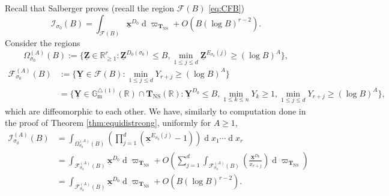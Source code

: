 \documentclass[11pt,letterpaper]{amsart}
\newcommand{\BG}{{\mathbb {G}}}
\newcommand{\BR}{{\mathbb {R}}}
\newcommand{\CF}{{\mathcal {F}}}
\newcommand{\CI}{{\mathcal {I}}}
\newcommand{\xx}{\underline{\mathbf{x}}}
\newcommand{\YY}{\underline{\mathbf{Y}}}
\newcommand{\ZZ}{\underline{\mathbf{Z}}}
\newcommand{\CTNS}{\mathbf{T}_{\operatorname{NS}}}
\theoremstyle{plain}
\numberwithin{equation}{section}
\theoremstyle{definition}
\theoremstyle{remark}
\begin{document}
 Recall that Salberger \cite[Lemma 11.38]{Salberger} proves (recall the region $\CF(B)$ \eqref{eq:CFB})	$$\CI_{\sigma_0}(B)=\int_{\CF(B)}\xx^{D_0}\operatorname{d}\varpi_{\CTNS}+O(B(\log B)^{r-2}).$$ Consider the regions
	$$\Omega_{\sigma_0}^{(A)}(B):=\{\ZZ\in\BR_{\geqslant 1}^r:\ZZ^{D_0(\sigma_0)}\leqslant B,\min_{1\leqslant j\leqslant d}\ZZ^{E_{\sigma_0}(j)}\geqslant (\log B)^A\}, $$
\begin{align*}
	\CF_{\sigma_0}^{(A)}(B)&:=\{\YY\in\CF(B):\min_{1\leqslant j\leqslant d}Y_{r+j}\geqslant (\log B)^A\}\\ &=\{\YY\in \BG_{\operatorname{m}}^{\triangle(1)}(\BR)\cap \CTNS(\BR):\YY^{D_0}\leqslant B,\min_{1\leqslant k\leqslant n}Y_k\geqslant 1,\min_{1\leqslant j\leqslant d}Y_{r+j}\geqslant (\log B)^A\},
\end{align*} which are diffeomorphic to each other.	We have, similarly to computation done in the proof of Theorem \ref{thm:equidistrcong}, uniformly for $A\geqslant 1$, \begin{align*}
\CI_{\sigma_0}^{(A)}(B)&=\int_{\Omega_{\sigma_0}^{(A)}(B)}\left(\prod_{j=1}^{d}(\xx^{E_{\sigma_0}(j)}-1)\right)\operatorname{d}x_1\cdots\operatorname{d}x_r\\ &=\int_{\CF_{\sigma_0}^{(A)}(B)}\xx^{D_0}\operatorname{d}\varpi_{\CTNS}+O\left(\sum_{j=1}^{d}\int_{\CF_{\sigma_0}^{(A)}(B)}\left(\frac{\xx^{D_0}}{x_{r+j}}\right)\operatorname{d}\varpi_{\CTNS}\right)\\&=\int_{\CF_{\sigma_0}^{(A)}(B)}\xx^{D_0}\operatorname{d}\varpi_{\CTNS}+O(B(\log B)^{r-2}).
\end{align*}
\end{document}
